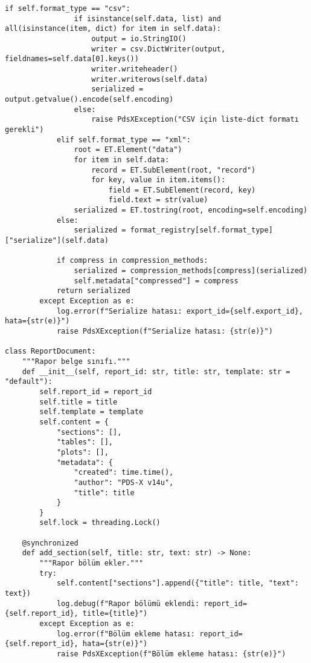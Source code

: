 \documentclass[a4paper,12pt]{article}
\begin{document}
\begin{lstlisting}[caption={export_report_doc.py Source Code}, label={lst:code}]
            if self.format_type == "csv":
                if isinstance(self.data, list) and all(isinstance(item, dict) for item in self.data):
                    output = io.StringIO()
                    writer = csv.DictWriter(output, fieldnames=self.data[0].keys())
                    writer.writeheader()
                    writer.writerows(self.data)
                    serialized = output.getvalue().encode(self.encoding)
                else:
                    raise PdsXException("CSV için liste-dict formatı gerekli")
            elif self.format_type == "xml":
                root = ET.Element("data")
                for item in self.data:
                    record = ET.SubElement(root, "record")
                    for key, value in item.items():
                        field = ET.SubElement(record, key)
                        field.text = str(value)
                serialized = ET.tostring(root, encoding=self.encoding)
            else:
                serialized = format_registry[self.format_type]["serialize"](self.data)
            
            if compress in compression_methods:
                serialized = compression_methods[compress](serialized)
                self.metadata["compressed"] = compress
            return serialized
        except Exception as e:
            log.error(f"Serialize hatası: export_id={self.export_id}, hata={str(e)}")
            raise PdsXException(f"Serialize hatası: {str(e)}")

class ReportDocument:
    """Rapor belge sınıfı."""
    def __init__(self, report_id: str, title: str, template: str = "default"):
        self.report_id = report_id
        self.title = title
        self.template = template
        self.content = {
            "sections": [],
            "tables": [],
            "plots": [],
            "metadata": {
                "created": time.time(),
                "author": "PDS-X v14u",
                "title": title
            }
        }
        self.lock = threading.Lock()

    @synchronized
    def add_section(self, title: str, text: str) -> None:
        """Rapor bölüm ekler."""
        try:
            self.content["sections"].append({"title": title, "text": text})
            log.debug(f"Rapor bölümü eklendi: report_id={self.report_id}, title={title}")
        except Exception as e:
            log.error(f"Bölüm ekleme hatası: report_id={self.report_id}, hata={str(e)}")
            raise PdsXException(f"Bölüm ekleme hatası: {str(e)}")


\end{lstlisting}
\end{document}
